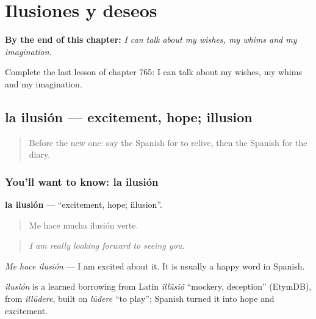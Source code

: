 
\chapter{Ilusiones y deseos}
\label{ch:es-ilusiones-y-deseos}

\begin{chapteropening}
\textbf{By the end of this chapter:} \emph{I can talk about my wishes, my whims and my imagination.}

Complete the last lesson of chapter 765: I can talk about my wishes, my whims and my imagination.
\end{chapteropening}

\section[la ilusión]{la ilusión — excitement, hope; illusion}

\label{lesson:ES-C765-ilusion}



\begin{quote}
Before the new one: say the Spanish for to relive, then the Spanish for the diary.
\end{quote}

\subsection*{You'll want to know: la ilusión}
\textbf{la ilusión} — \textquotedblleft{}excitement, hope; illusion\textquotedblright{}.

\begin{quote}
Me hace mucha ilusión verte.
\end{quote}

\begin{quote}
\emph{I am really looking forward to seeing you.}
\end{quote}

\emph{Me hace ilusión} — I am excited about it. It is usually a happy word in Spanish.

\begin{cousinweb}
\emph{ilusión} is a learned borrowing from Latin \emph{illūsiō} \textquotedblleft{}mockery, deception\textquotedblright{} (EtymDB), from \emph{illūdere}, built on \emph{lūdere} \textquotedblleft{}to play\textquotedblright{}; Spanish turned it into hope and excitement.
\end{cousinweb}

